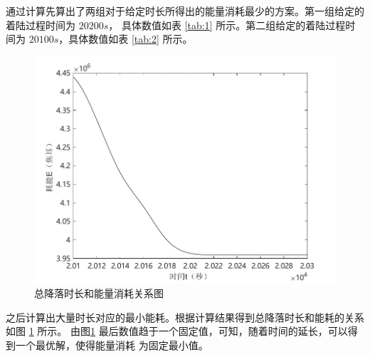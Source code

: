 \documentclass[hyperref,a4paper,UTF8]{ctexart}
\begin{document}
通过计算先算出了两组对于给定时长所得出的能量消耗最少的方案。第一组给定的着陆过程时间为 $20200s$，
具体数值如表 \ref{tab:1} 所示。第二组给定的着陆过程时间为 $20100s$，具体数值如表
\ref{tab:2} 所示。
\begin{figure}[hbt!]
    \centering
    \includegraphics[scale=0.6]{问题2图像.pdf}
    \caption{总降落时长和能量消耗关系图}
    \label{pic:ans2}
\end{figure}
之后计算出大量时长对应的最小能耗。根据计算结果得到总降落时长和能耗的关系如图 \ref{pic:ans2} 所示。
由图\ref{pic:ans2} 最后数值趋于一个固定值，可知，随着时间的延长，可以得到一个最优解，使得能量消耗
为固定最小值。
\end{document}
